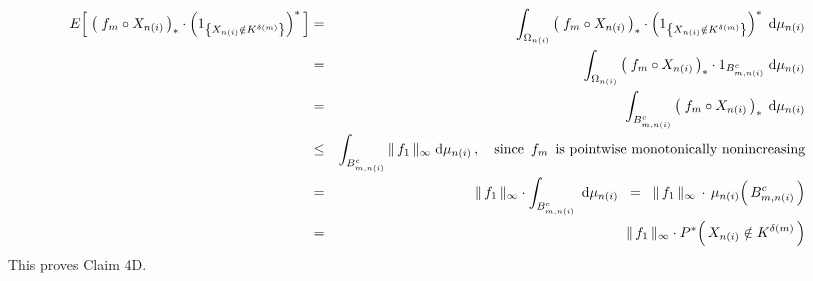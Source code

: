 \begin{eqnarray*}
E\!\left[\;
	\left(\;f_{m} \circ X_{n(i)}\,\right)_{*}
	\cdot
	\left(1_{\left\{X_{n(i)} \notin K^{\delta(m)}\right\}}\right)^{*}
\,\right]
&=&
	\int_{\Omega_{n(i)}}
		\left(\;f_{m} \circ X_{n(i)}\,\right)_{*}
		\cdot
		\left(1_{\left\{X_{n(i)} \notin K^{\delta(m)}\right\}}\right)^{*}
	\;\textnormal{d}\mu_{n(i)}
\\
&=&
	\int_{\Omega_{n(i)}}
		\left(\;f_{m} \circ X_{n(i)}\,\right)_{*}
		\cdot
		1_{B_{m,n(i)}^{c}}
	\;\textnormal{d}\mu_{n(i)}
\\
&=&
	\int_{B_{m,n(i)}^{c}}
		\left(\;f_{m} \circ X_{n(i)}\,\right)_{*}
	\;\textnormal{d}\mu_{n(i)}
\\
&\leq&
	\int_{B_{m,n(i)}^{c}} \Vert\,f_{1}\,\Vert_{\infty} \;\textnormal{d}\mu_{n(i)}\,,
	\quad
	\textnormal{since \,$f_{m}$\, is pointwise monotonically nonincreasing}
\\
&=&
	\Vert\,f_{1}\,\Vert_{\infty} \cdot \int_{B_{m,n(i)}^{c}} \;\textnormal{d}\mu_{n(i)}
\;\; = \;\;
	\Vert\,f_{1}\,\Vert_{\infty} \,\cdot\, \mu_{n(i)}\!\left(\,B_{m,n(i)}^{c}\,\right)
\\
&=&
	\Vert\,f_{1}\,\Vert_{\infty} \cdot P^{*}\!\left(\,X_{n(i)} \notin K^{\delta(m)}\,\right)
\end{eqnarray*}
This proves Claim 4D.

